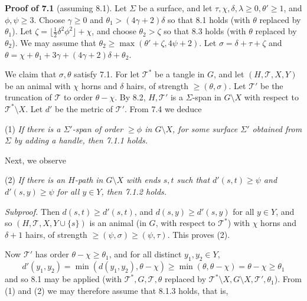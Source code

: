 \textbf{Proof of 7.1} (assuming 8.1). Let $\Sigma$ be a surface, and let $\tau, \chi, \delta, \lambda \ge 0, \theta' \ge 1$, and $\phi, \psi \ge 3$. Choose $\gamma \ge 0$ and $\theta_1 > (4\gamma + 2)\delta$ so that 8.1 holds (with $\theta$ replaced by $\theta_1$). Let $\zeta = \lfloor \frac{1}{2}\delta^2 \phi^2 \rfloor + \chi$, and choose $\theta_2 > \zeta$ so that 8.3 holds (with $\theta$ replaced by $\theta_2$). We may assume that $\theta_2 \ge \max(\theta' + \zeta, 4\psi + 2)$. Let $\sigma = \delta + \tau + \zeta$ and $\theta = \chi + \theta_1 + 3\gamma + (4\gamma + 2)\delta + \theta_2$.

We claim that $\sigma, \theta$ satisfy 7.1. For let $\mathscr{T}^*$ be a tangle in $G$, and let $(H, \mathscr{T}, X, Y)$ be an animal with $\chi$ horns and $\delta$ hairs, of strength $\ge (\theta, \sigma)$. Let $\mathscr{T}'$ be the truncation of $\mathscr{T}$ to order $\theta - \chi$. By 8.2, $H, \mathscr{T}'$ is a $\Sigma$-span in $G \setminus X$ with respect to $\mathscr{T}^* \setminus X$. Let $d'$ be the metric of $\mathscr{T}'$. From 7.4 we deduce

\hspace*{12pt}(1) \textit{If there is a $\Sigma'$-span of order $\ge \phi$ in $G \setminus X$, for some surface $\Sigma'$ obtained from $\Sigma$ by adding a handle, then 7.1.1 holds.}

Next, we observe

\hspace*{12pt}(2) \textit{If there is an $H$-path in $G \setminus X$ with ends $s, t$ such that $d'(s, t) \ge \psi$ and $d'(s, y) \ge \psi$ for all $y \in Y$, then 7.1.2 holds.}

\textit{Subproof.} Then $d(s, t) \ge d'(s, t)$, and $d(s, y) \ge d'(s, y)$ for all $y \in Y$, and so $(H, \mathscr{T}, X, Y \cup \{s\})$ is an animal (in $G$, with respect to $\mathscr{T}^*$) with $\chi$ horns and $\delta + 1$ hairs, of strength $\ge (\psi, \sigma) \ge (\psi, \tau)$. This proves (2).

Now $\mathscr{T}'$ has order $\theta - \chi \ge \theta_1$, and for all distinct $y_1, y_2 \in Y$,
\begin{equation*}
d'(y_1, y_2) = \min(d(y_1, y_2), \theta - \chi) \ge \min(\theta, \theta - \chi) = \theta - \chi \ge \theta_1
\end{equation*}
and so 8.1 may be applied (with $\mathscr{T}^*, G, \mathscr{T}, \theta$ replaced by $\mathscr{T}^* \setminus X, G \setminus X, \mathscr{T}', \theta_1$). From (1) and (2) we may therefore assume that 8.1.3 holds, that is,

